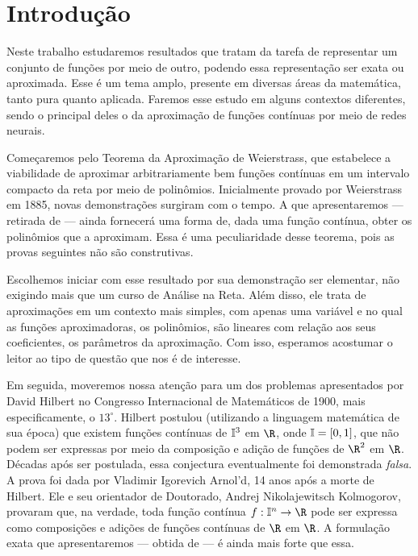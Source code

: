 \section{Introdução}

Neste trabalho estudaremos resultados que tratam da tarefa de representar um conjunto de funções por meio de outro, podendo essa representação ser exata ou aproximada.
Esse é um tema amplo, presente em diversas áreas da matemática, tanto pura quanto aplicada.
Faremos esse estudo em alguns contextos diferentes, sendo o principal deles o da aproximação de funções contínuas por meio de redes neurais.

Começaremos pelo Teorema da Aproximação de Weierstrass, que estabelece a viabilidade de aproximar arbitrariamente bem funções contínuas em um intervalo compacto da reta por meio de polinômios.
Inicialmente provado por Weierstrass em 1885, novas demonstrações surgiram com o tempo.
A que apresentaremos --- retirada de \cite{weierstrass} --- ainda fornecerá uma forma de, dada uma função contínua, obter os polinômios que a aproximam.
Essa é uma peculiaridade desse teorema, pois as provas seguintes não são construtivas.

Escolhemos iniciar com esse resultado por sua demonstração ser elementar, não exigindo mais que um curso de Análise na Reta.
Além disso, ele trata de aproximações em um contexto mais simples, com apenas uma variável e no qual as funções aproximadoras, os polinômios, são lineares com relação aos seus coeficientes, os parâmetros da aproximação.
Com isso, esperamos acostumar o leitor ao tipo de questão que nos é de interesse.

Em seguida, moveremos nossa atenção para um dos problemas apresentados por David Hilbert no Congresso Internacional de Matemáticos de 1900, mais especificamente, o \( 13^{ \circ } \).
Hilbert postulou (utilizando a linguagem matemática de sua época) que existem funções contínuas de \( \mathbb{I}^{ 3 } \) em \( \R \), onde \( \mathbb{I} = [0, 1] \), que não podem ser expressas por meio da composição e adição de funções de \( \R^{ 2 } \) em \( \R \).
Décadas após ser postulada, essa conjectura eventualmente foi demonstrada \emph{falsa}.
A prova foi dada por Vladimir Igorevich Arnol'd, 14 anos após a morte de Hilbert.
Ele e seu orientador de Doutorado, Andrej Nikolajewitsch Kolmogorov, provaram que, na verdade, toda função contínua \( f : \I^{ n } \to \R \) pode ser expressa como composições e adições de funções contínuas de \( \R \) em \( \R \).
A formulação exata que apresentaremos --- obtida de \cite{hilbert} --- é ainda mais forte que essa.

